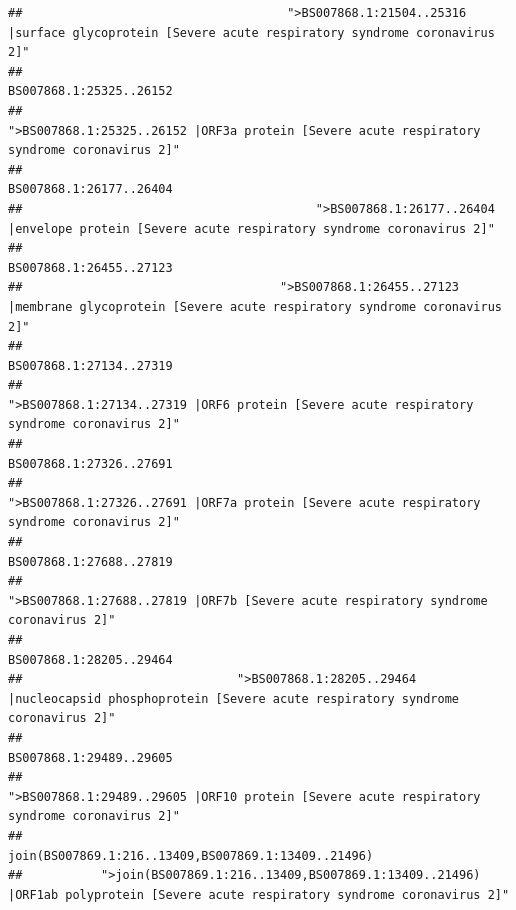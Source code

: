 \documentclass[
]{article}
\begin{document}
\begin{verbatim}
##                                     ">BS007868.1:21504..25316 |surface glycoprotein [Severe acute respiratory syndrome coronavirus 2]" 
##                                                                                                                BS007868.1:25325..26152 
##                                            ">BS007868.1:25325..26152 |ORF3a protein [Severe acute respiratory syndrome coronavirus 2]" 
##                                                                                                                BS007868.1:26177..26404 
##                                         ">BS007868.1:26177..26404 |envelope protein [Severe acute respiratory syndrome coronavirus 2]" 
##                                                                                                                BS007868.1:26455..27123 
##                                    ">BS007868.1:26455..27123 |membrane glycoprotein [Severe acute respiratory syndrome coronavirus 2]" 
##                                                                                                                BS007868.1:27134..27319 
##                                             ">BS007868.1:27134..27319 |ORF6 protein [Severe acute respiratory syndrome coronavirus 2]" 
##                                                                                                                BS007868.1:27326..27691 
##                                            ">BS007868.1:27326..27691 |ORF7a protein [Severe acute respiratory syndrome coronavirus 2]" 
##                                                                                                                BS007868.1:27688..27819 
##                                                    ">BS007868.1:27688..27819 |ORF7b [Severe acute respiratory syndrome coronavirus 2]" 
##                                                                                                                BS007868.1:28205..29464 
##                              ">BS007868.1:28205..29464 |nucleocapsid phosphoprotein [Severe acute respiratory syndrome coronavirus 2]" 
##                                                                                                                BS007868.1:29489..29605 
##                                            ">BS007868.1:29489..29605 |ORF10 protein [Severe acute respiratory syndrome coronavirus 2]" 
##                                                                                    join(BS007869.1:216..13409,BS007869.1:13409..21496) 
##           ">join(BS007869.1:216..13409,BS007869.1:13409..21496) |ORF1ab polyprotein [Severe acute respiratory syndrome coronavirus 2]" 

\end{verbatim}
\end{document}
